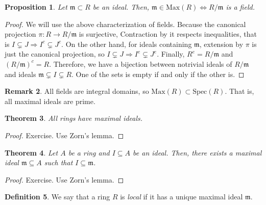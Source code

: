 \documentclass[11pt]{article}
\newtheorem{theorem}{Theorem}[section]
\newtheorem{prop}[theorem]{Proposition}
\theoremstyle{definition}
\newtheorem{defn}[theorem]{Definition}
\newtheorem{rk}[theorem]{Remark}
\begin{document}
        \begin{prop}
            Let $\mathfrak{m} \subset R$ be an ideal.
            Then, $\mathfrak{m} \in \text{Max}(R) \Leftrightarrow R/\mathfrak{m}$ is a field.
        \end{prop}

            \begin{proof}
                We will use the above characterization of fields.
                Because the canonical projection $\pi: R \rightarrow R/\mathfrak{m}$ is surjective,
                Contraction by it respects inequalities, that is $I \subsetneq J \Rightarrow I^c \subsetneq J^c$.
                On the other hand, for ideals containing $\mathfrak{m}$, extension by $\pi$ is just the canonical projection,
                so $I \subsetneq J \Rightarrow I^e \subsetneq J^e$.
                Finally, $R^e = R/\mathfrak{m}$ and $(R/\mathfrak{m})^c = R$.
                Therefore, we have a bijection between notrivial ideals of $R/\mathfrak{m}$
                and ideals $\mathfrak{m} \subsetneq I \subsetneq R$.
                One of the sets is empty if and only if the other is.
            \end{proof}

        \begin{rk}
            All fields are integral domains, so $\text{Max}(R) \subset \text{Spec}(R)$.
            That is, all maximal ideals are prime.
        \end{rk}

        \begin{theorem}
            All rings have maximal ideals.
        \end{theorem}
            \begin{proof}
                Exercise.
                Use Zorn's lemma.
            \end{proof}

        \begin{theorem}
            Let $A$ be a ring and $I \subseteq A$ be an ideal.
            Then, there exists a maximal ideal $\mathfrak{m} \subseteq A$ such that $I \subseteq \mathfrak{m}$.
        \end{theorem}
            \begin{proof}
                Exercise.
                Use Zorn's lemma.
            \end{proof}

        \begin{defn}
            We say that a ring $R$ is \emph{local} if it has a unique maximal ideal $\mathfrak{m}$.
        \end{defn}
\end{document}
